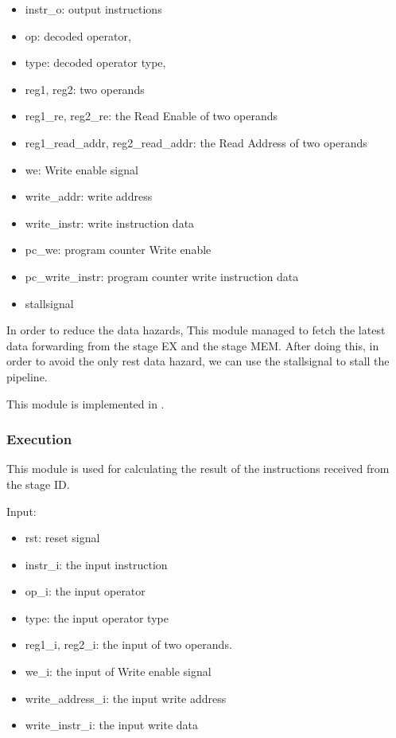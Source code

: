 \documentclass{article}
\begin{document}
\begin{itemize}
\item instr\_o: output instructions
\item op: decoded operator,
\item type: decoded operator type,
\item reg1, reg2: two operands
\item reg1\_re, reg2\_re: the Read Enable of two operands
\item reg1\_read\_addr, reg2\_read\_addr: the Read Address of two operands
\item we: Write enable signal
\item write\_addr: write address
\item write\_instr: write instruction data
\item pc\_we: program counter Write enable
\item pc\_write\_instr: program counter write instruction data
\item stallsignal
\end{itemize}

In order to reduce the data hazards, This module managed to fetch the latest data forwarding from the stage EX and the stage MEM. After doing this, in order to avoid the only rest data hazard, we can use the stallsignal to stall the pipeline.

This module is implemented in .

\newpage
\subsubsection{Execution}
This module is used for calculating the result of the instructions received from the stage ID.

Input:

\begin{itemize}
\item rst: reset signal
\item instr\_i: the input instruction
\item op\_i: the input operator
\item type: the input operator type
\item reg1\_i, reg2\_i: the input of two operands.
\item we\_i: the input of Write enable signal
\item write\_address\_i: the input write address
\item write\_instr\_i: the input write data
\end{itemize}
\end{document}
